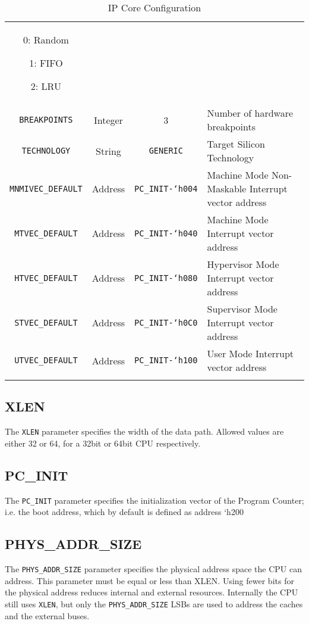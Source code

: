 \begin{longtable}[]{@{}cccp{7cm}@{}}
0: Random

1: FIFO

2: LRU\tabularnewline

\texttt{BREAKPOINTS} & Integer & 3 & Number of hardware breakpoints\tabularnewline
\texttt{TECHNOLOGY} & String & \texttt{GENERIC} & Target Silicon Technology\tabularnewline

\texttt{MNMIVEC\_DEFAULT} & Address & \texttt{PC\_INIT-`h004} & Machine Mode Non-Maskable Interrupt vector address\tabularnewline

\texttt{MTVEC\_DEFAULT} & Address & \texttt{PC\_INIT-`h040} & Machine Mode Interrupt vector address\tabularnewline

\texttt{HTVEC\_DEFAULT} & Address & \texttt{PC\_INIT-`h080} & Hypervisor Mode Interrupt vector address\tabularnewline

\texttt{STVEC\_DEFAULT} & Address & \texttt{PC\_INIT-`h0C0} & Supervisor Mode Interrupt vector address\tabularnewline

\texttt{UTVEC\_DEFAULT} & Address & \texttt{PC\_INIT-`h100} & User Mode Interrupt vector address\tabularnewline
\bottomrule
\caption{IP Core Configuration}
\label{tab:ip-core-configuration}
\end{longtable}


\subsection{XLEN}\label{xlen}

The \texttt{XLEN} parameter specifies the width of the data path. Allowed values
are either 32 or 64, for a 32bit or 64bit CPU respectively.

\subsection{PC\_INIT}\label{pc_init}

The \texttt{PC\_INIT} parameter specifies the initialization vector of the
Program Counter; i.e. the boot address, which by default is defined as
address `h200

\subsection{PHYS\_ADDR\_SIZE}\label{phys_addr_size}

The \texttt{PHYS\_ADDR\_SIZE} parameter specifies the physical address space the
CPU can address. This parameter must be equal or less than XLEN. Using
fewer bits for the physical address reduces internal and external
resources. Internally the CPU still uses \texttt{XLEN}, but only the
\texttt{PHYS\_ADDR\_SIZE} LSBs are used to address the caches and the external
buses.

